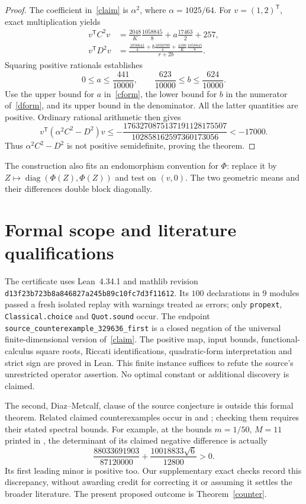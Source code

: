 \documentclass[11pt]{article}
\begin{document}
\begin{proof}
The coefficient in~\eqref{claim} is $\alpha^2$, where $\alpha=1025/64$.
For $v=(1,2)^\mathsf T$, exact multiplication yields
\begin{align}
 v^\mathsf T C^2v&=\frac{2048}{K}\frac{1058845}{8}
                   +a\frac{17463}{2}+257,\label{cform}\\
 v^\mathsf T D^2v&=
 \frac{\frac{1050641}{4}+b\frac{1056799}{4}
                  +\frac{4100}{K}\frac{1058845}{8}}{r+2b}.\label{dform}
\end{align}
Squaring positive rationals establishes
\[
 0\leq a\leq\frac{441}{10000},\qquad
 \frac{623}{10000}\leq b\leq\frac{624}{10000}.
\]
Use the upper bound for $a$ in~\eqref{cform}, the lower bound for $b$
in the numerator of~\eqref{dform}, and its upper bound in the denominator.
All the latter quantities are positive. Ordinary rational arithmetic then gives
\begin{equation}\label{gap}
 v^\mathsf T(\alpha^2 C^2-D^2)v
 \leq-\frac{1763270875137191128175507}{102858162597360173056}
 <-17000.
\end{equation}
Thus $\alpha^2C^2-D^2$ is not positive semidefinite, proving the theorem.
\end{proof}

The construction also fits an endomorphism convention for $\Phi$:
replace it by $Z\mapsto\operatorname{diag}(\Phi(Z),\Phi(Z))$ and test on
$(v,0)$. The two geometric means and their differences double block diagonally.

\section*{Formal scope and literature qualifications}
The certificate uses Lean~4.34.1 and mathlib revision
\texttt{d13f23b723b8a846827a245b89c10fc7d3f11612}.
Its $100$ declarations in $9$ modules passed a fresh isolated replay with
warnings treated as errors; only \texttt{propext}, \texttt{Classical.choice}
and \texttt{Quot.sound} occur. The endpoint
\texttt{source\_counterexample\_}\allowbreak\texttt{329636\_first} is a closed negation of the
universal finite-dimensional version of~\eqref{claim}. The positive map,
input bounds, functional-calculus square roots, Riccati identifications,
quadratic-form interpretation and strict sign are proved in Lean.
This finite instance suffices to refute the source's unrestricted operator
assertion. No optimal constant or additional discovery is claimed.

The second, Diaz--Metcalf, clause of the source conjecture is outside this
formal theorem. Related claimed counterexamples occur in \cite[Remark~1]{H}
and \cite[Remark~2.4]{E}; checking them requires their stated spectral bounds.
For example, at the bounds $m=1/50$, $M=11$ printed in \cite{H}, the determinant
of its claimed negative difference is actually
\[
 \frac{88033691903}{87120000}+\frac{10018833\sqrt6}{12800}>0.
\]
Its first leading minor is positive too. Our supplementary exact checks record
this discrepancy, without awarding credit for correcting it or assuming it
settles the broader literature. The present proposed outcome is Theorem~\ref{counter}.
\end{document}
